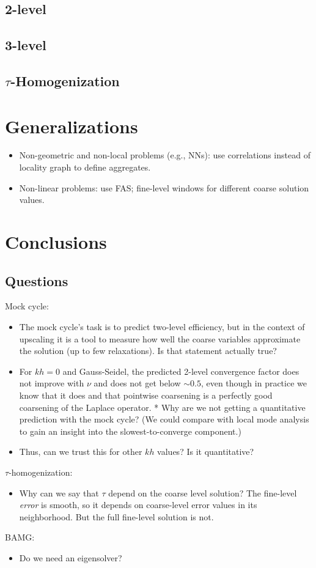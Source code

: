 \documentclass{article}
\begin{document}
\subsection{2-level}

\subsection{3-level}

\subsection{$\tau$-Homogenization}

\section{Generalizations}
\begin{itemize}
	\item Non-geometric and non-local problems (e.g., NNs): use correlations instead of locality graph to define aggregates.
	\item Non-linear problems: use FAS; fine-level windows for different coarse solution values.
\end{itemize}

\section{Conclusions}

\subsection{Questions}
Mock cycle:
\begin{itemize}
\item The mock cycle's task is to predict two-level efficiency, but in the context of upscaling it is a tool to measure how well the coarse variables approximate the solution (up to few relaxations). Is that statement actually true?
\item For $kh = 0$ and Gauss-Seidel, the predicted 2-level convergence factor does not improve with $\nu$ and does not get below $\sim 0.5$, even though in practice we know that it does and that pointwise coarsening is a perfectly good coarsening of the Laplace operator.
* Why are we not getting a quantitative prediction with the mock cycle? (We could compare with local mode analysis to gain an insight into the slowest-to-converge component.)
\item Thus, can we trust this for other $kh$ values? Is it quantitative?
\end{itemize}
$\tau$-homogenization:
\begin{itemize}
	\item Why can we say that $\tau$ depend on the coarse level solution? The fine-level \emph{error} is smooth, so it depends on coarse-level error values in its neighborhood. But the full fine-level solution is not.
\end{itemize}
BAMG:
\begin{itemize}
	\item Do we need an eigensolver?
\end{itemize}




\end{document}
